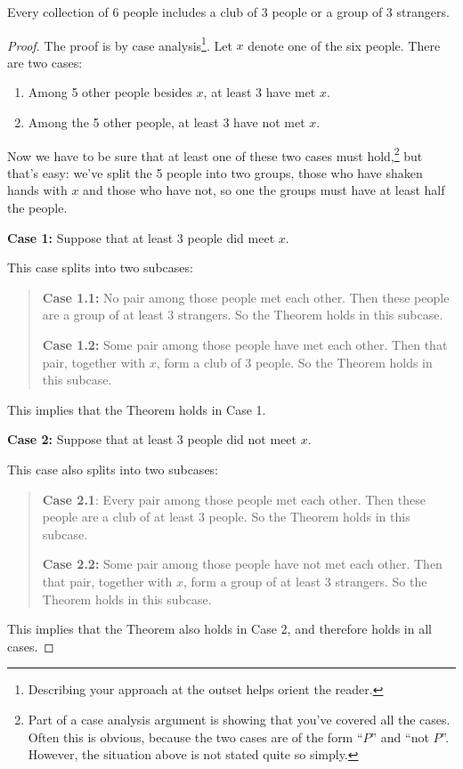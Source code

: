 \begin{theorem*}
Every collection of 6 people includes a club of 3 people or a group of 3
strangers.
\end{theorem*}

\begin{proof}
The proof is by case analysis\footnote{Describing your approach at the
outset helps orient the reader.}.  Let $x$ denote one of the six
people.  There are two cases:

\begin{enumerate}
\item\label{3met} Among 5 other people besides $x$, at least 3 have met
  $x$.

\item \label{3notmet} Among the 5 other people, at least 3 have not met
  $x$.
\end{enumerate}

Now we have to be sure that at least one of these two cases must
hold,\footnote{Part of a case analysis argument is showing that you've
  covered all the cases.  Often this is obvious, because the two cases are
  of the form ``$P$'' and ``not $P$''.  However, the situation above is
  not stated quite so simply.} but that's easy: we've split the 5 people
into two groups, those who have shaken hands with $x$ and those who have
not, so one the groups must have at least half the people.

\textbf{Case 1:}  Suppose that at least 3 people did meet $x$.

This case splits into two subcases:
\begin{quote}

\textbf{Case 1.1:} No pair among those people met each other.  Then these
people are a group of at least 3 strangers.  So the Theorem holds in this
subcase.

\textbf{Case 1.2:} Some pair among those people have met each other.
Then that pair, together with $x$, form a club of 3 people.  So the
Theorem holds in this subcase.

\end{quote}
This implies that the Theorem holds in Case 1.

\textbf{Case 2:} Suppose that at least 3 people did not meet $x$.

This case also splits into two subcases:
\begin{quote}

\textbf{Case 2.1}: Every pair among those people met each other.  Then these
people are a club of at least 3 people.   So the Theorem holds in this subcase.

\textbf{Case 2.2:} Some pair among those people have not met each other.
Then that pair, together with $x$, form a group of at least 3 strangers.
So the Theorem holds in this subcase.

\end{quote}
This implies that the Theorem also holds in Case 2, and therefore holds in
all cases.
\end{proof}

